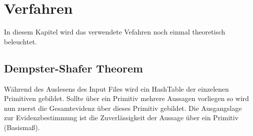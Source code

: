 \chapter{Verfahren}
In diesem Kapitel wird das verwendete Vefahren noch einmal
theoretisch beleuchtet.
\section{Dempster-Shafer Theorem}
  Während des Auslesens des Input Files wird ein HashTable
  der einzelenen Primitiven gebildet. Sollte über ein Primitiv 
  mehrere Aussagen vorliegen so wird nun zuerst die Gesamtevidenz
  über dieses Primitiv gebildet. Die Ausgangslage zur 
  Evidenzbestimmung ist die Zuverlässigkeit der Aussage über
  ein Primitiv (Basismaß).
